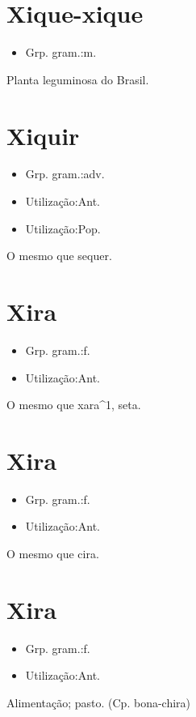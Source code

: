 \section{Xique-xique}
\begin{itemize}
\item {Grp. gram.:m.}
\end{itemize}
Planta leguminosa do Brasil.
\section{Xiquir}
\begin{itemize}
\item {Grp. gram.:adv.}
\end{itemize}
\begin{itemize}
\item {Utilização:Ant.}
\end{itemize}
\begin{itemize}
\item {Utilização:Pop.}
\end{itemize}
O mesmo que \textunderscore sequer\textunderscore .
\section{Xira}
\begin{itemize}
\item {Grp. gram.:f.}
\end{itemize}
\begin{itemize}
\item {Utilização:Ant.}
\end{itemize}
O mesmo que \textunderscore xara\textunderscore ^1, seta.
\section{Xira}
\begin{itemize}
\item {Grp. gram.:f.}
\end{itemize}
\begin{itemize}
\item {Utilização:Ant.}
\end{itemize}
O mesmo que \textunderscore cira\textunderscore .
\section{Xira}
\begin{itemize}
\item {Grp. gram.:f.}
\end{itemize}
\begin{itemize}
\item {Utilização:Ant.}
\end{itemize}
Alimentação; pasto.
(Cp. \textunderscore bona-chira\textunderscore )
